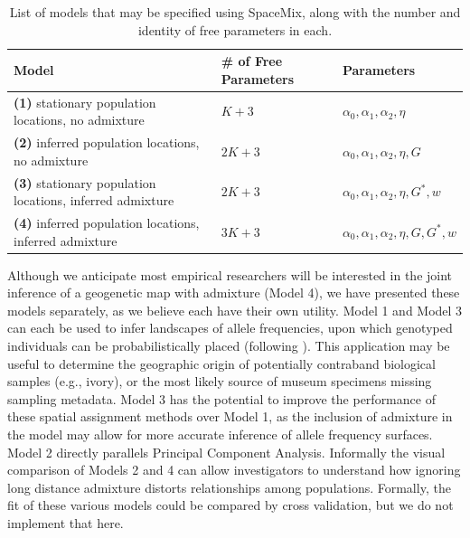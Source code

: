 \documentclass[10pt,letterpaper]{article}
\newcommand{\identifyadmixsource}[1]{{#1^{*}}}
\begin{document}
\begin{centering}
\begin{table}
\begin{tabular}{| >{\centering\arraybackslash}m{6cm} | >{\centering\arraybackslash}m{3cm} | l |}
	\hline
	\textbf{Model} & \textbf{\# of Free Parameters} & \textbf{Parameters}\\ \hline
	\textbf{(1)} stationary population locations, no admixture & $K + 3$	& $\alpha_0,\alpha_1,\alpha_2,\eta$	\\ \hline
	\textbf{(2)} inferred population locations, \hspace{0.5cm}no admixture & $2K + 3$	& $\alpha_0,\alpha_1,\alpha_2,\eta,G$	\\ \hline
	\textbf{(3)} stationary population locations, inferred admixture & $2K + 3$	& $\alpha_0,\alpha_1,\alpha_2,\eta,\identifyadmixsource{G},w$	\\ \hline
	\textbf{(4)} inferred population locations, inferred admixture & $3K + 3$	&$\alpha_0,\alpha_1,\alpha_2,\eta,G,\identifyadmixsource{G},w$	\\
	\hline
\end{tabular}
\caption{
    List of models that may be specified using SpaceMix, along with the number and identity of free parameters in each.
}\label{tab:model_options}
\end{table}
\end{centering}

Although we anticipate most empirical researchers will be interested in the joint inference of a geogenetic map with admixture (Model 4), we have presented these models separately, as we believe each have their own utility.  Model 1 and Model 3 can each be used to infer landscapes of allele frequencies, upon which genotyped individuals can be probabilistically placed (following \cite{Wasser2004}).  This application may be useful to determine the geographic origin of potentially contraband biological samples (e.g., ivory), or the most likely source of museum specimens missing sampling metadata.  Model 3 has the potential to improve the performance of these spatial assignment methods over Model 1, as the inclusion of admixture in the model may allow for more accurate inference of allele frequency surfaces.  Model 2 directly parallels Principal Component Analysis.  Informally the visual comparison of Models 2 and 4 can allow investigators to understand how ignoring long distance admixture distorts relationships among populations. Formally, the fit of these various models could be compared by cross validation, but we do not implement that here.
\end{document}
